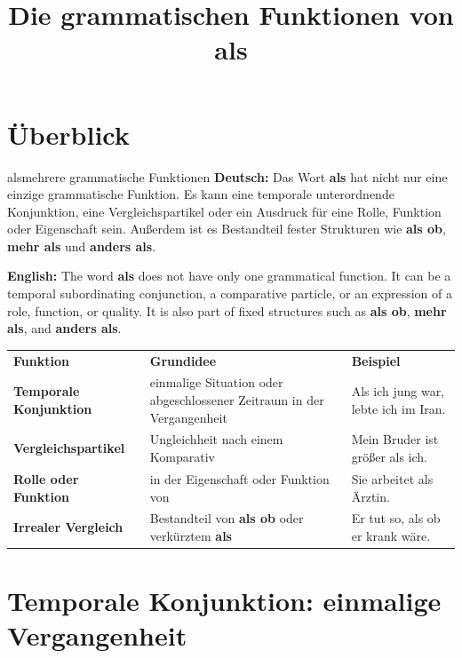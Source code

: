 \documentclass[a4paper,11pt]{article}
\title{Die grammatischen Funktionen von \glqq als\grqq}
\date{}
\newcommand{\GermanText}[1]{\textbf{Deutsch: }#1\par}
\newcommand{\EnglishText}[1]{{\small\color{SoftGray}\textbf{English: }#1\par}}
\begin{document}
    \maketitle
    \tableofcontents
    \newpage

    \section{Überblick}

        \begin{grammarentry}{als}{mehrere grammatische Funktionen}
            \GermanText{Das Wort \textbf{als} hat nicht nur eine einzige grammatische Funktion. Es kann eine temporale unterordnende Konjunktion, eine Vergleichspartikel oder ein Ausdruck für eine Rolle, Funktion oder Eigenschaft sein. Außerdem ist es Bestandteil fester Strukturen wie \textbf{als ob}, \textbf{mehr als} und \textbf{anders als}.}
            \EnglishText{The word \textbf{als} does not have only one grammatical function. It can be a temporal subordinating conjunction, a comparative particle, or an expression of a role, function, or quality. It is also part of fixed structures such as \textbf{als ob}, \textbf{mehr als}, and \textbf{anders als}.}
        \end{grammarentry}

        \begin{longtable}{>{\bfseries}p{3.5cm}|p{5.6cm}|p{6.0cm}}
            \rowcolor{HeaderBlueDark}
            \color{white}\textbf{Funktion} &
            \color{white}\textbf{Grundidee} &
            \color{white}\textbf{Beispiel} \\
            Temporale Konjunktion & einmalige Situation oder abgeschlossener Zeitraum in der Vergangenheit & Als ich jung war, lebte ich im Iran. \\
            Vergleichspartikel & Ungleichheit nach einem Komparativ & Mein Bruder ist größer als ich. \\
            Rolle oder Funktion & in der Eigenschaft oder Funktion von & Sie arbeitet als Ärztin. \\
            Irrealer Vergleich & Bestandteil von \textbf{als ob} oder verkürztem \textbf{als} & Er tut so, als ob er krank wäre. \\
        \end{longtable}

    \section{Temporale Konjunktion: einmalige Vergangenheit}
\end{document}
